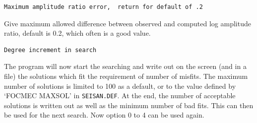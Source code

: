 \begin{enumerate}
\begin{verbatim}
Maximum amplitude ratio error,  return for default of .2
\end{verbatim}

Give maximum allowed difference between observed and computed log amplitude ratio, default is 0.2, which often is a good value.

\begin{verbatim}
Degree increment in search
\end{verbatim}



\end{enumerate}

%
%

The program will now start the searching and write out on the screen (and in a file) the solutions which fit the requirement of number of misfits. The maximum number of solutions is limited to 100 as a default, or to the value defined by `FOCMEC MAXSOL' in \texttt{SEISAN.DEF}. At the end, the number of acceptable solutions is written out as well as the minimum number of bad fits. This can then be used for the next search. Now option 0 to 4 can be used again. 

